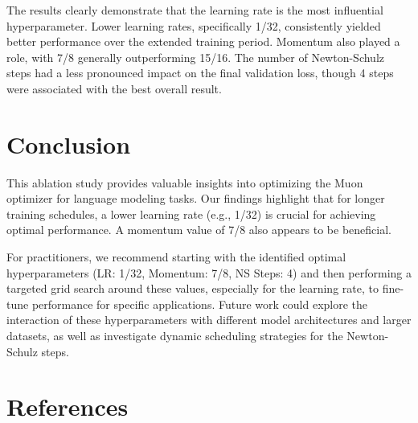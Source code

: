\documentclass{article}
\begin{document}
The results clearly demonstrate that the learning rate is the most influential hyperparameter. Lower learning rates, specifically 1/32, consistently yielded better performance over the extended training period. Momentum also played a role, with 7/8 generally outperforming 15/16. The number of Newton-Schulz steps had a less pronounced impact on the final validation loss, though 4 steps were associated with the best overall result.

\section{Conclusion}
This ablation study provides valuable insights into optimizing the Muon optimizer for language modeling tasks. Our findings highlight that for longer training schedules, a lower learning rate (e.g., 1/32) is crucial for achieving optimal performance. A momentum value of 7/8 also appears to be beneficial.

For practitioners, we recommend starting with the identified optimal hyperparameters (LR: 1/32, Momentum: 7/8, NS Steps: 4) and then performing a targeted grid search around these values, especially for the learning rate, to fine-tune performance for specific applications. Future work could explore the interaction of these hyperparameters with different model architectures and larger datasets, as well as investigate dynamic scheduling strategies for the Newton-Schulz steps.

\section*{References}
\end{document}
